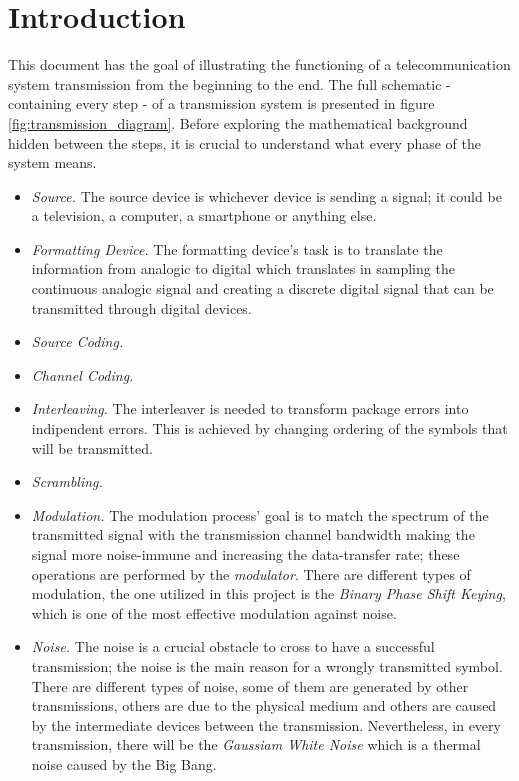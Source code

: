 \section{Introduction}

This document has the goal of illustrating the functioning of a telecommunication system transmission from the beginning to the end. The full schematic - containing every step - of a transmission system is presented in figure \ref{fig:transmission_diagram}. Before exploring the mathematical background hidden between the steps, it is crucial to understand what every phase of the system means.

\begin{itemize}
\renewcommand{\labelitemi}{$\diamond$}
    \item \textsl{Source.} The source device is whichever device is sending a signal; it could be a television, a computer, a smartphone or anything else.
    \item \textsl{Formatting Device.} The formatting device's task is to translate the information from analogic to digital which translates in sampling the continuous analogic signal and creating a discrete digital signal that can be transmitted through digital devices.
    \item \textsl{Source Coding.} \blindtext
    \item \textsl{Channel Coding.} \blindtext
    \item \textsl{Interleaving.} The interleaver is needed to transform package errors into indipendent errors. This is achieved by changing ordering of the symbols that will be transmitted.
    \item \textsl{Scrambling.} \blindtext
    \item \textsl{Modulation.} The modulation process' goal is to match the spectrum of the transmitted signal with the transmission channel bandwidth making the signal more noise-immune and increasing the data-transfer rate; these operations are performed by the \textit{modulator}. There are different types of modulation, the one utilized in this project is the \textsl{Binary Phase Shift Keying}, which is one of the most effective modulation against noise. 
    \item \textsl{Noise.} The noise is a crucial obstacle to cross to have a successful transmission; the noise is the main reason for a wrongly transmitted symbol. There are different types of noise, some of them are generated by other transmissions, others are due to the physical medium and others are caused by the intermediate devices between the transmission. Nevertheless, in every transmission, there will be the \textsl{Gaussiam White Noise} which is a thermal noise caused by the Big Bang.

\end{itemize}
